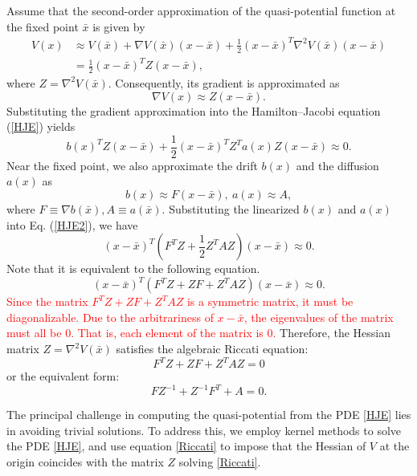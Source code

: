 \documentclass[11pt]{article}
\theoremstyle{plain}      %
\theoremstyle{definition} %
\begin{document}
Assume that the second-order approximation of the quasi-potential function at the fixed point \( \bar{x} \) is given by
\[
\begin{aligned}
V(x) & \approx V(\bar{x}) + \nabla V(\bar{x}) (x - \bar{x}) + \frac{1}{2} (x - \bar{x})^T \nabla^2 V(\bar{x}) (x - \bar{x}) \\
& = \frac{1}{2} (x - \bar{x})^T Z (x - \bar{x}),
\end{aligned}
\]
where \( Z = \nabla^2 V(\bar{x}) \). Consequently, its gradient is approximated as
\[
\nabla V(x) \approx Z (x - \bar{x}).
\]
Substituting the gradient approximation into the Hamilton–Jacobi equation (\ref{HJE}) yields
\begin{equation}\label{HJE2}
b(x)^T Z (x - \bar{x}) + \frac{1}{2} (x - \bar{x})^T Z^T a(x) Z (x - \bar{x}) \approx 0.
\end{equation}
Near the fixed point, we also approximate the drift $b(x)$ and the diffusion $a(x)$ as
\[
b(x) \approx F(x-\bar{x}), \ a(x) \approx A,
\]
where $F \equiv \nabla b(\bar{x}), A \equiv a(\bar{x})$. Substituting the linearized $b(x)$ and $a(x)$ into Eq. (\ref{HJE2}), we have
\begin{equation}\label{HJE3}
(x - \bar{x})^T (F^TZ + \frac{1}{2} Z^TAZ) (x - \bar{x}) \approx 0.
\end{equation}
Note that it is equivalent to the following equation.
\begin{equation}\label{HJE4}
(x - \bar{x})^T (F^TZ + ZF + Z^TAZ) (x - \bar{x}) \approx 0.
\end{equation}
\textcolor{red}{Since the matrix $F^TZ + ZF + Z^TAZ$ is a symmetric matrix, it must be diagonalizable. Due to the arbitrariness of $x - \bar{x}$, the eigenvalues of the matrix must all be 0. That is, each element of the matrix is 0.} Therefore, the Hessian matrix \( Z = \nabla^2 V(\bar{x}) \) satisfies the algebraic Riccati equation:
\begin{equation}\label{HJE5}
 F^TZ + ZF + Z^TAZ= 0
\end{equation}
or the equivalent form:
\begin{equation}
\label{Riccati}
FZ^{-1} + Z^{-1}F^T + A = 0.
\end{equation}

The principal challenge in computing the quasi-potential from the PDE \eqref{HJE} lies in avoiding trivial solutions. To address this, we employ kernel methods to solve the PDE \eqref{HJE}, and use equation \eqref{Riccati} to impose that the Hessian of \( V \) at the origin coincides with the matrix \( Z \) solving \eqref{Riccati}.
\end{document}

